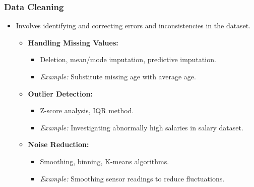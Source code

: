 \documentclass{beamer}
\begin{document}
\begin{frame}[fragile]
    \frametitle{Data Cleaning}
    \begin{itemize}
        \item Involves identifying and correcting errors and inconsistencies in the dataset.
        \begin{itemize}
            \item \textbf{Handling Missing Values:}
            \begin{itemize}
                \item Deletion, mean/mode imputation, predictive imputation.
                \item \textit{Example:} Substitute missing age with average age.
            \end{itemize}
            
            \item \textbf{Outlier Detection:}
            \begin{itemize}
                \item Z-score analysis, IQR method.
                \item \textit{Example:} Investigating abnormally high salaries in salary dataset.
            \end{itemize}
            
            \item \textbf{Noise Reduction:}
            \begin{itemize}
                \item Smoothing, binning, K-means algorithms.
                \item \textit{Example:} Smoothing sensor readings to reduce fluctuations.
            \end{itemize}
        \end{itemize}
    \end{itemize}
\end{frame}
\end{document}
